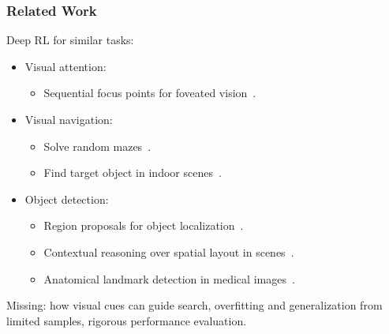 \begin{frame}
    \frametitle{Related Work}

    Deep RL for similar tasks:

    \begin{itemize}
        \item Visual attention:
        \begin{itemize}
            \item Sequential focus points for foveated vision~\cite{mnih_recurrent_2014}.
        \end{itemize}
        \item Visual navigation:
        \begin{itemize}
            \item Solve random mazes~\cite{mirowski_learning_2017}.
            \item Find target object in indoor scenes~\cite{zhu_target-driven_2017}.
        \end{itemize}
        \item Object detection:
        \begin{itemize}
            \item Region proposals for object localization~\cite{caicedo_active_2015}.
            \item Contextual reasoning over spatial layout in scenes~\cite{chen_spatial_2017}.
            \item Anatomical landmark detection in medical images~\cite{ghesu_multi-scale_2019}.
        \end{itemize}
    \end{itemize}

    Missing: how visual cues can guide search, overfitting and generalization from limited samples, rigorous performance evaluation.
\end{frame}